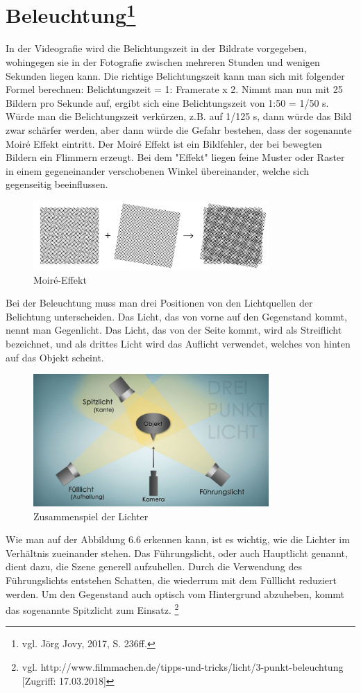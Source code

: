 \section[Beleuchtung]{Beleuchtung\protect\footnote{\label{}vgl. Jörg Jovy, 2017, S. 236ff.}}
In der Videografie wird die Belichtungszeit in der Bildrate vorgegeben, wohingegen sie in der Fotografie zwischen mehreren Stunden und wenigen Sekunden liegen kann.
Die richtige Belichtungszeit kann man sich mit folgender Formel berechnen: Belichtungszeit = 1: Framerate x 2. Nimmt man nun mit 25 Bildern pro Sekunde auf, ergibt sich eine Belichtungszeit von 1:50 = 1/50 s. Würde man die Belichtungszeit verkürzen, z.B. auf 1/125 s, dann würde das Bild zwar schärfer werden, aber dann würde die Gefahr bestehen, dass der sogenannte Moir\'{e} Effekt eintritt. Der Moir\'{e} Effekt ist ein Bildfehler, der bei bewegten Bildern ein Flimmern erzeugt. Bei dem "Effekt" liegen feine Muster oder Raster in einem gegeneinander verschobenen Winkel übereinander, welche sich gegenseitig beeinflussen. 
\begin{figure}[H]
	\centering
	\includegraphics[width=0.8\textwidth]{abb2} 
	\caption{Moir\'{e}-Effekt}
\end{figure}
Bei der Beleuchtung muss man drei Positionen von den Lichtquellen der Belichtung unterscheiden. Das Licht, das von vorne auf den Gegenstand kommt, nennt man Gegenlicht. Das Licht, das von der Seite kommt, wird als Streiflicht bezeichnet, und als drittes Licht wird das Auflicht verwendet, welches von hinten auf das Objekt scheint.
\begin{figure}[H]
	\centering
	\includegraphics[width=0.8\textwidth]{abb3} 
	\caption{Zusammenspiel der Lichter}
\end{figure}
Wie man auf der Abbildung 6.6 erkennen kann, ist es wichtig, wie die Lichter im Verhältnis zueinander stehen. Das Führungslicht, oder auch Hauptlicht genannt, dient dazu, die Szene generell aufzuhellen. Durch die Verwendung des Führungslichts entstehen Schatten, die wiederrum mit dem Fülllicht reduziert werden. Um den Gegenstand auch optisch vom Hintergrund abzuheben, kommt das sogenannte Spitzlicht zum Einsatz. \footnote{\label{}vgl. http://www.filmmachen.de/tipps-und-tricks/licht/3-punkt-beleuchtung [Zugriff: 17.03.2018]}
